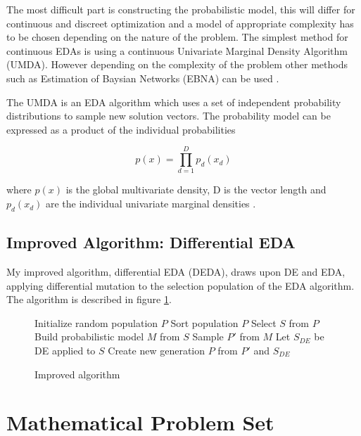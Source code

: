 The most difficult part is constructing the probabilistic model, this will differ for continuous and discreet optimization and a model of appropriate complexity has to be chosen depending on the nature of the problem. The simplest method for continuous EDAs is using a continuous Univariate Marginal Density Algorithm (UMDA). However depending on the complexity of the problem other methods such as Estimation of Baysian Networks (EBNA) can be used \cite{larranaga2012review}.

The UMDA is an EDA algorithm which uses a set of independent probability distributions to sample new solution vectors. The probability model can be expressed as a product of the individual probabilities

\begin{equation}
  p(x) = \prod _{d=1}^D {p_d(x_d)}
\end{equation}

where $p(x)$ is the global multivariate density, D is the vector length and $p_d(x_d)$ are the individual univariate marginal densities \cite{povsik2004estimation}.


\subsection{Improved Algorithm: Differential EDA}

My improved algorithm, differential EDA (DEDA), draws upon DE and EDA, applying differential mutation to the selection population of the EDA algorithm. The algorithm is described in figure \ref{algo:my}.


\begin{figure}[h]
  \centering
  \begin{minipage}{12.5cm}
    \begin{algorithmic}
      \State Initialize random population $P$
      \Repeat
        \State Sort population $P$
        \State Select $S$ from $P$
        \State Build probabilistic model $M$ from $S$
        \State Sample $P'$ from $M$
        \State Let $S_{DE}$ be DE applied to $S$
        \State Create new generation $P$ from $P'$ and $S_{DE}$
    \end{algorithmic}
  \end{minipage}
  \caption{Improved algorithm}
  \label{algo:my}
\end{figure}



\section{Mathematical Problem Set}

